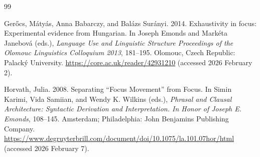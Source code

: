 \documentclass[ruler]{CUP-JNL-LIN}%
\begin{document}
\begin{Backmatter}
\begin{thebibliography}{99}

{Gerőcs, Mátyás, Anna Babarczy, and Balázs Surányi}. 2014. Exhaustivity in focus: Experimental evidence from Hungarian. In Joseph Emonds and Markéta Janebová (eds.), \textit{Language Use and Linguistic Structure Proceedings of the Olomouc Linguistics Colloquium 2013}, 181--195. Olomouc, Czech Republic: Palacký University. \url{https://core.ac.uk/reader/42931210}  (accessed 2026 February 2).




{Horvath, Julia}. 2008. Separating “Focus Movement” from Focus. In Simin Karimi, Vida Samiian, and Wendy K. Wilkins (eds.), \textit{Phrasal and Clausal Architecture: Syntactic Derivation and Interpretation. In Honor of Joseph E. Emonds}, 108--145. Amsterdam; Philadelphia: John Benjamins Publishing Company. \url{https://www.degruyterbrill.com/document/doi/10.1075/la.101.07hor/html} (accessed 2026 February 7).



\end{thebibliography}
\end{Backmatter}
\end{document}
